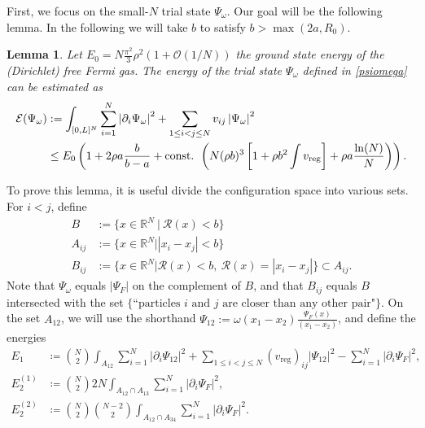 \documentclass[a4paper,11pt]{article}
\newcommand{\abs}[1]{\left\lvert #1 \right\rvert}
\newcommand{\R}{\mathbb{R}}
\newcommand{\rr}{\mathcal{R}}
\newtheorem{lemma}[theorem]{Lemma}
\numberwithin{equation}{section}
\begin{document}
	First, we focus on the small-$N$ trial state $\Psi_\omega$. Our goal will be the following lemma. In the following we will take $b$ to satisfy $b>\max(2a,R_0)$.
	\begin{lemma}
		\label{LemmaUpperBoundFewParticles}
		Let $E_0=N\frac{\pi^2}{3}\rho^2(1+\mathcal{O}(1/N)) $ the ground state energy of the (Dirichlet) free Fermi gas. The energy of the trial state $\Psi_\omega$ defined in \eqref{psiomega} can be estimated as 
		\begin{equation}
			\begin{aligned}
				\mathcal{E}(\Psi_\omega)&:=\int_{[0,L]^N} \sum_{i=1}^{N}\abs{\partial_i\Psi_\omega}^2+\sum_{1\leq i<j\leq N}v_{ij}\abs{\Psi_\omega}^2\\
				&\leq E_0\left(1+2\rho a\frac{b}{b-a}+\textnormal{const. } \left(N(\rho b)^3\left[1+\rho b^2\int v_\textnormal{reg}\right]+\rho a \frac{\ln(N)}{N}\right)\right).
			\end{aligned}
		\end{equation}
	\end{lemma}
	To prove this lemma, it is useful divide the configuration space into various sets. For $i<j$, define 
	\begin{equation}
		\begin{aligned}
			B&:=\{x\in\R^N\ \vert\ \mathcal{R}(x)<b \}\\
			A_{ij}&:=\{x\in\R^N\vert \abs{x_i-x_j}<b\}\\
			B_{ij}&:=\{x\in\R^N \vert \rr(x)<b,\ \rr(x)=\abs{x_i-x_j} \}\subset A_{ij}.
		\end{aligned}
	\end{equation}
	Note that $ \Psi_\omega$ equals $\abs{\Psi_F} $ on the complement of $B$, and that $ B_{ij} $ equals $ B $ intersected with the set $ \{\text{``particles $i$ and $j$ are closer than any other pair"}\} $. On the set $A_{12}$, we will use the shorthand $\Psi_{12}:=\omega(x_1-x_2)\frac{\Psi_F(x)}{(x_1-x_2)}$, and define the energies
	\begin{equation}
		\begin{aligned}
			E_1&\coloneqq\binom{N}{2}\int_{A_{12}} \sum_{i=1}^{N}\abs{\partial_i\Psi_{12}}^2+\sum_{1\leq i<j\leq N}(v_{\text{reg}})_{ij}\abs{\Psi_{12}}^2-\sum_{i=1}^{N}\abs{\partial_i\Psi_F}^2, \\
			E_2^{(1)}&\coloneqq\binom{N}{2}2N\int_{A_{12}\cap A_{13}}\sum_{i=1}^{N}\abs{\partial_i\Psi_F}^2,\\ E_2^{(2)}&\coloneqq\binom{N}{2}\binom{N-2}{2}\int_{A_{12}\cap A_{34}}\sum_{i=1}^{N}\abs{\partial_i\Psi_F}^2.
		\end{aligned}
	\end{equation}
\end{document}

